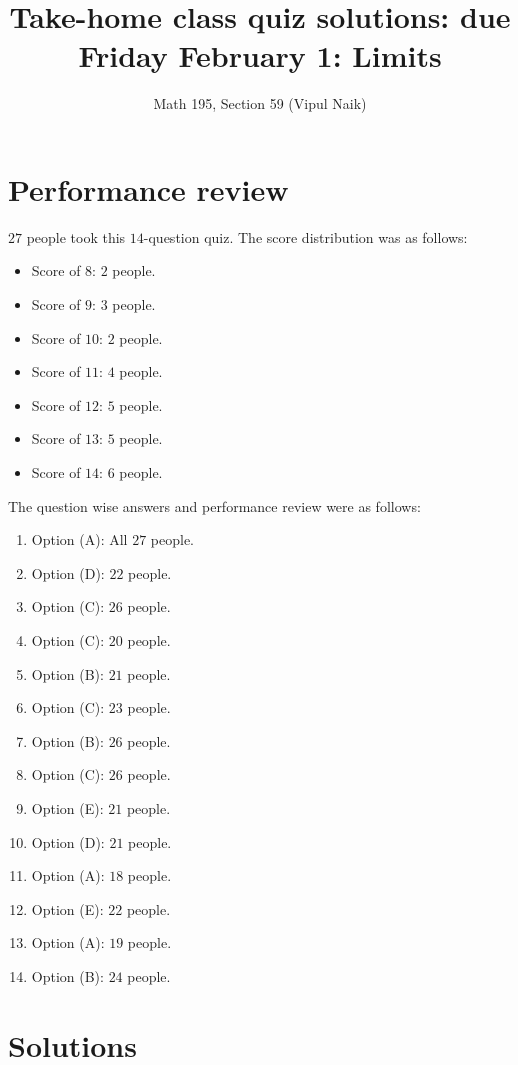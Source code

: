 \documentclass[10pt]{amsart}
\title{Take-home class quiz solutions: due Friday February 1: Limits}
\author{Math 195, Section 59 (Vipul Naik)}
\begin{document}
\maketitle

\section{Performance review}

$27$ people took this $14$-question quiz. The score distribution was
as follows:

\begin{itemize}
\item Score of $8$: $2$ people.
\item Score of $9$: $3$ people.
\item Score of $10$: $2$ people.
\item Score of $11$: $4$ people.
\item Score of $12$: $5$ people.
\item Score of $13$: $5$ people.
\item Score of $14$: $6$ people.
\end{itemize}

The question wise answers and performance review were as follows:

\begin{enumerate}
\item Option (A): All $27$ people.
\item Option (D): $22$ people.
\item Option (C): $26$ people.
\item Option (C): $20$ people.
\item Option (B): $21$ people.
\item Option (C): $23$ people.
\item Option (B): $26$ people.
\item Option (C): $26$ people.
\item Option (E): $21$ people.
\item Option (D): $21$ people.
\item Option (A): $18$ people.
\item Option (E): $22$ people.
\item Option (A): $19$ people.
\item Option (B): $24$ people.
\end{enumerate}

\section{Solutions}
\end{document}
